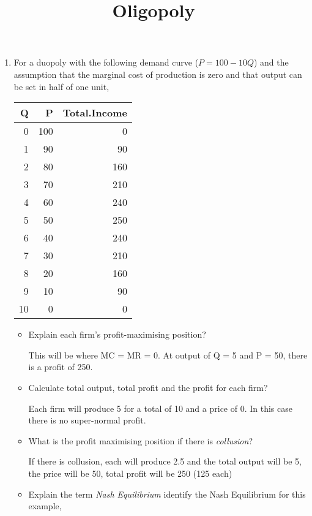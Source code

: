\documentclass[12pt, a4paper, oneside]{article}\usepackage[]{graphicx}\usepackage[]{color}
\author{}
\date{}
\begin{document}
\title{Oligopoly}
\maketitle


\begin{enumerate}
\item For a duopoly with the following demand curve ($P = 100 - 10Q$) and the assumption that the marginal cost of production is zero and that output can be set in half of one unit, 
\begin{table}[ht]
\centering
\begin{tabular}{rrr}
  \hline
Q & P & Total.Income \\ 
  \hline
0 & 100 & 0 \\ 
  1 & 90 & 90 \\ 
  2 & 80 & 160 \\ 
  3 & 70 & 210 \\ 
  4 & 60 & 240 \\ 
  5 & 50 & 250 \\ 
  6 & 40 & 240 \\ 
  7 & 30 & 210 \\ 
  8 & 20 & 160 \\ 
  9 & 10 & 90 \\ 
  10 & 0 & 0 \\ 
   \hline
\end{tabular}
\end{table}

\begin{itemize}
\item Explain each firm's profit-maximising position? 

This will be where MC = MR = 0.  At output of Q = 5 and P = 50, there is a profit of 250.

\item Calculate total output, total profit and the profit for each firm? 

Each firm will produce 5 for a total of 10 and a price of 0.  In this case there is no super-normal profit.

\item What is the profit maximising position if there is \emph{collusion}?

If there is collusion, each will produce 2.5 and the total output will be 5, the price will be 50, total profit will be 250 (125 each)

\item Explain the term \emph{Nash Equilibrium} identify the Nash Equilibrium for this example,


\end{itemize}
\end{enumerate}
\end{document}

